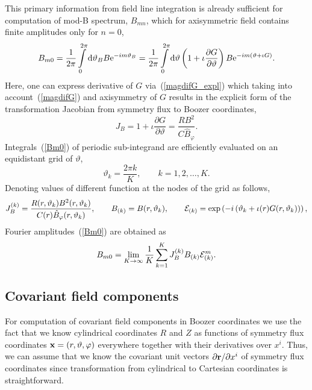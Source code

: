 \documentclass[12pt]{article}
\newcommand{\be}[1]{\begin{equation} \label{#1}}
\newcommand{\ee}{\end{equation}}
\newcommand{\eq}[1]{(\ref{#1})}
\newcommand{\difp}[2]{\frac{\partial #1}{\partial #2}}
\newcommand{\br}{{\bf r}}
\newcommand{\bx}{{\bf x}}
\newcommand{\re}{{\rm e}}
\newcommand{\rd}{{\rm d}}
\newcommand{\cE}{{\cal E}}
\begin{document}
\noindent
This primary information from field line integration is already sufficient for computation of mod-B spectrum, $B_{mn}$, which for axisymmetric field
contains finite amplitudes only for $n=0$,
\be{Bm0}
B_{m0}=\frac{1}{2\pi}\int\limits_0^{2\pi} \rd\vartheta_B B \re^{-i m \vartheta_B}
=\frac{1}{2\pi}\int\limits_0^{2\pi} \rd\vartheta \left(1+\iota \difp{G}{\vartheta}\right) B \re^{-i m \left(\vartheta+\iota G\right)}.
\ee
Here, one can express derivative of $G$ via~\eq{magdifG_expl} which taking into account~\eq{magdifG} and axisymmetry of $G$ results in
the explicit form of the transformation Jacobian from symmetry flux to Boozer coordinates,
\be{transfactor}
J_B=1+\iota \difp{G}{\vartheta}=\frac{R B^2}{C \hat B_\varphi}.
\ee
Integrals~\eq{Bm0} of periodic sub-integrand are efficiently evaluated on an equidistant grid of $\vartheta$,
\be{thetak}
\vartheta_k = \frac{2\pi k}{K}, \qquad k=1,2,\dots,K.
\ee
Denoting values of different function at the nodes of the grid as follows,
\be{fnodes}
J_B^{(k)} = \frac{R(r,\vartheta_k) B^2(r,\vartheta_k)}{C(r)\hat B_\varphi(r,\vartheta_k)},
\qquad
B_{(k)} = B(r,\vartheta_k),
\qquad
\cE_{(k)} = \exp\left(- i \left(\vartheta_k + \iota(r)G(r,\vartheta_k)\right)\right),
\ee
Fourier amplitudes~\eq{Bm0} are obtained as
\be{Bm0num}
B_{m0}=\lim_{K\rightarrow\infty}\frac{1}{K}\sum\limits_{k=1}^K J_B^{(k)} B_{(k)} \cE_{(k)}^m.
\ee

\subsection{Covariant field components}
\label{ssec:covar}

For computation of covariant field components in Boozer coordinates 
we use the fact that we know cylindrical coordinates $R$ and $Z$ as functions of symmetry flux coordinates $\bx=(r,\vartheta,\varphi)$
everywhere together with their derivatives over $x^i$. Thus, we can assume that we know the covariant unit vectors 
$\partial \br / \partial x^i$ of symmetry flux coordinates since transformation from cylindrical to Cartesian coordinates is straightforward.
\end{document}

